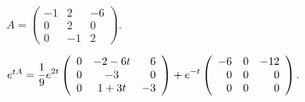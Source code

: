 \documentclass{ximera}
\begin{document}
\begin{exercise} \label{c12.1.8d}
$A = \left(\begin{array}{rrr} -1 & 2 & -6\\ 0 & 2 & 0 \\ 0 & -1 & 2
\end{array}\right)$.

\begin{solution}
\ans $e^{tA}= \displaystyle\frac{1}{9}e^{2t}\left(\begin{array}{rcr} 
0 & -2-6t & 6\\ 0 & -3 & 0\\ 0 & 1+3t & -3\end{array}\right) 
+e^{-t}\left(\begin{array}{rrr} -6 & 0 & -12\\  0 & 0 & 0 \\ 0 & 0 & 0 
\end{array}\right)$.



\end{solution}
\end{exercise}
\end{document}
